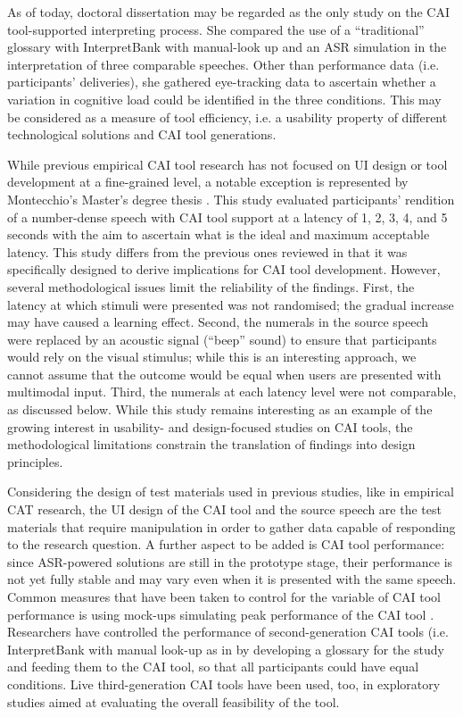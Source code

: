 As of today,  doctoral dissertation may be regarded as the only study on the CAI tool-supported interpreting process. She compared the use of a ``traditional'' glossary with InterpretBank with manual-look up and an ASR simulation in the interpretation of three comparable speeches. Other than performance data (i.e. participants’ deliveries), she gathered eye-tracking data to ascertain whether a variation in cognitive load could be identified in the three conditions. This may be considered as a measure of tool efficiency, i.e. a usability property of different technological solutions and CAI tool generations.

While previous empirical CAI tool research has not focused on UI design or tool development at a fine-grained level, a notable exception is represented by Montecchio’s Master’s degree thesis \citep{fantinuoli2022defining,montecchio2021}. This study evaluated participants’ rendition of a number-dense speech with CAI tool support at a latency of 1, 2, 3, 4, and 5 seconds with the aim to ascertain what is the ideal and maximum acceptable latency. This study differs from the previous ones reviewed in that it was specifically designed to derive implications for CAI tool development. However, several methodological issues limit the reliability of the findings. First, the latency at which stimuli were presented was not randomised; the gradual increase may have caused a learning effect. Second, the numerals in the source speech were replaced by an acoustic signal (``beep'' sound) to ensure that participants would rely on the visual stimulus; while this is an interesting approach, we cannot assume that the outcome would be equal when users are presented with multimodal input. Third, the numerals at each latency level were not comparable, as discussed below. While this study remains interesting as an example of the growing interest in usability- and design-focused studies on CAI tools, the methodological limitations constrain the translation of findings into design principles.

Considering the design of test materials used in previous studies, like in empirical CAT research, the UI design of the CAI tool and the source speech are the test materials that require manipulation in order to gather data capable of responding to the research question. A further aspect to be added is CAI tool performance: since ASR-powered solutions are still in the prototype stage, their performance is not yet fully stable and may vary even when it is presented with the same speech. Common measures that have been taken to control for the variable of CAI tool performance is using mock-ups simulating peak performance of the CAI tool \citep{canali2019technologie,desmet2018simultaneous}. Researchers have controlled the performance of second-generation CAI tools (i.e. InterpretBank with manual look-up as in \cite{biagini2015glossario,gacek2015softwarelosungen,prandi2015a,prandi2022a} by developing a glossary for the study and feeding them to the CAI tool, so that all participants could have equal conditions. Live third-generation CAI tools \citep{defrancq2021automatic,pisani2021measuring,vanreconnaissance} have been used, too, in exploratory studies aimed at evaluating the overall feasibility of the tool.

